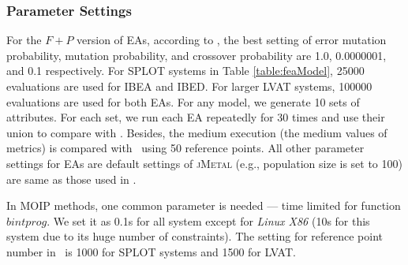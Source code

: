 \subsubsection{Parameter Settings}
 For the $F+P$ version of EAs, %
according to \cite{DBLP:conf/issta/TanXCSLD15}\cite{DBLP:journals/asc/XueZT0CC016},  the best setting of error mutation probability, mutation probability, and crossover probability are  1.0, 0.0000001, and 0.1 respectively. %
For SPLOT systems in Table \ref{table:feaModel}, 25000 evaluations are used  for IBEA and IBED. For larger LVAT systems, 100000 evaluations are used for both EAs. For any model, we generate 10 sets of attributes. For each set, we run each EA repeatedly for 30 times and use their union to compare with \ourSol. Besides, the medium execution (the medium values of metrics) is compared with \ourSol~using 50 reference points. %
All other parameter settings for EAs are default settings of \textsc{jMetal} (e.g., population size is set to 100) are same as those used in \cite{DBLP:conf/icse/SayyadMA13}\cite{conf/cmsbse/SayyadMA13}\cite{DBLP:conf/issta/TanXCSLD15}\cite{DBLP:journals/asc/XueZT0CC016}.

In MOIP methods,  one common parameter is needed --- time limited for function $bintprog$. We set it as 0.1s for all system except for \emph{Linux X86} (10s for this system due to its huge number of constraints). The setting for reference point number in \ourSol~is 1000 for SPLOT  systems and 1500 for LVAT.


